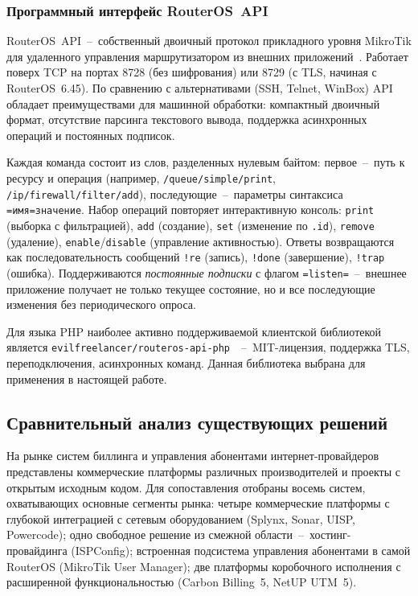 \subsubsection{Программный интерфейс RouterOS~API}

RouterOS~API~--~собственный двоичный протокол прикладного уровня MikroTik для удаленного управления маршрутизатором из внешних приложений~\cite{routerosapi}. Работает поверх TCP на портах 8728 (без шифрования) или 8729 (с TLS, начиная с RouterOS~6.45). По сравнению с альтернативами (SSH, Telnet, WinBox) API обладает преимуществами для машинной обработки: компактный двоичный формат, отсутствие парсинга текстового вывода, поддержка асинхронных операций и постоянных подписок.

Каждая команда состоит из слов, разделенных нулевым байтом: первое~--~путь к ресурсу и операция (например, \texttt{/queue/simple/print}, \texttt{/ip/firewall/filter/add}), последующие~--~параметры синтаксиса \texttt{=имя=значение}. Набор операций повторяет интерактивную консоль: \texttt{print} (выборка с фильтрацией), \texttt{add} (создание), \texttt{set} (изменение по \texttt{.id}), \texttt{remove} (удаление), \texttt{enable}/\texttt{disable} (управление активностью). Ответы возвращаются как последовательность сообщений \texttt{!re} (запись), \texttt{!done} (завершение), \texttt{!trap} (ошибка). Поддерживаются \emph{постоянные подписки} с флагом \texttt{=listen=}~--~внешнее приложение получает не только текущее состояние, но и все последующие изменения без периодического опроса.

Для языка PHP наиболее активно поддерживаемой клиентской библиотекой является \texttt{evilfreelancer/routeros-api-php}~\cite{routerosphp}~--~MIT-лицензия, поддержка TLS, переподключения, асинхронных команд. Данная библиотека выбрана для применения в настоящей работе.

\subsection{Сравнительный анализ существующих решений}

На рынке систем биллинга и управления абонентами интернет-провайдеров представлены коммерческие платформы различных производителей и проекты с открытым исходным кодом. Для сопоставления отобраны восемь систем, охватывающих основные сегменты рынка: четыре коммерческие платформы с глубокой интеграцией с сетевым оборудованием (Splynx, Sonar, UISP, Powercode); одно свободное решение из смежной области~--~хостинг-провайдинга (ISPConfig); встроенная подсистема управления абонентами в самой RouterOS (MikroTik User Manager); две платформы коробочного исполнения с расширенной функциональностью (Carbon Billing~5, NetUP UTM~5).

